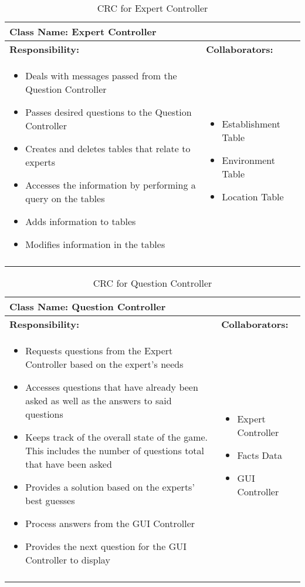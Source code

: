 \documentclass[titlepage]{article}
\begin{document}
	\begin{longtable}{| p{} | p{} |}
			\hline
			 \multicolumn{2}{|l|}{\textbf{Class Name: Expert Controller}} \\
			\hline
			\textbf{Responsibility:} & \textbf{Collaborators:} \\
			\hline
				\begin{itemize}
					\item Deals with messages passed from the Question Controller
					\item Passes desired questions to the Question Controller
					\item Creates and deletes tables that relate to experts
					\item Accesses the information by performing a query on the tables
					\item Adds information to tables
					\item Modifies information in the tables
				\end{itemize} & 
				\begin{itemize}
					\item Establishment Table
					\item Environment Table
					\item Location Table
				\end{itemize} 
				\\
			\hline
		\caption{CRC for Expert Controller}
	\end{longtable}
	
	
	\begin{longtable}{| p{} | p{} |}
			\hline
			 \multicolumn{2}{|l|}{\textbf{Class Name: Question Controller}} \\
			\hline
			\textbf{Responsibility:} & \textbf{Collaborators:} \\
			\hline
				\begin{itemize}
					\item Requests questions from the Expert Controller based on the expert's needs
					\item Accesses questions that have already been asked as well as the answers to said questions
					\item Keeps track of the overall state of the game. This includes the number of questions total that have been asked
					\item Provides a solution based on the experts' best guesses
					\item Process answers from the GUI Controller
					\item Provides the next question for the GUI Controller to display
				\end{itemize} & 
				\begin{itemize}
					\item Expert Controller
					\item Facts Data
					\item GUI Controller
				\end{itemize} 
				\\
			\hline
		\caption{CRC for Question Controller}
	\end{longtable}
	
\end{document}
